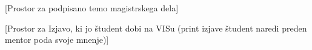 %
\hypersetup{pageanchor=false} %

\newpage

\mbox{}\thispagestyle{empty}
\newpage
\mbox{}\thispagestyle{empty}
\newpage
\mbox{}\thispagestyle{empty}
\newpage


\newpage
\mbox{}\thispagestyle{empty}
\newpage
\hypersetup{pageanchor=true} %

\thispagestyle{empty}
[Prostor za podpisano temo magistrskega dela]
\newpage
\mbox{}\thispagestyle{empty}
\newpage

\pagestyle{fancy_nohead}

\newpage
\mbox{}
\newpage

\thispagestyle{empty}
[Prostor za Izjavo, ki jo študent dobi na VISu (print izjave študent naredi preden mentor poda svoje mnenje)]
\newpage
\mbox{}
\newpage


\newpage

 